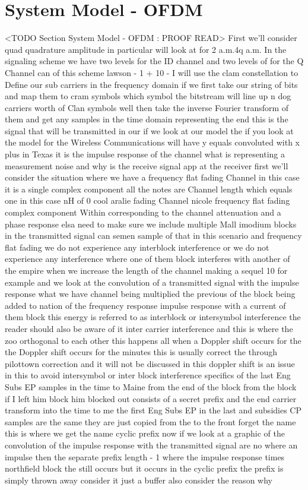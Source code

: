 \section{System Model - OFDM}
	<TODO Section System Model - OFDM : PROOF READ>
First we'll consider quad quadrature amplitude in particular will look at for 2 a.m.4q a.m. In the signaling scheme we have two levels for the ID channel and two levels of for the Q Channel can of this scheme lawson - 1 + 10 - I will use the clam constellation to Define our sub carriers in the frequency domain if we first take our string of bits and map them to cram symbols which symbol the bitstream will line up n dog carriers worth of Clan symbols well then take the inverse Fourier transform of them and get any samples in the time domain representing the end this is the signal that will be transmitted in our if we look at our model the if you look at the model for the Wireless Communications will have y equals convoluted with x plus in Texas it is the impulse response of the channel what is representing a measurement noise and why is the receive signal app at the receiver first we'll consider the situation where we have a frequency flat fading Channel in this case it is a single complex component all the notes are Channel length which equals one in this case nH of 0 cool aralie fading Channel nicole frequency flat fading complex component Within corresponding to the channel attenuation and a phase response elsa need to make sure we include multiple Mall imodium blocks in the transmitted signal can semen sample of that in this scenario and frequency flat fading we do not experience any interblock interference or we do not experience any interference where one of them block interferes with another of the empire when we increase the length of the channel making a sequel 10 for example and we look at the convolution of a transmitted signal with the impulse response what we have channel being multiplied the previous of the block being added to nation of the frequency response impulse response with a current of them block this energy is referred to as interblock or intersymbol interference the reader should also be aware of it inter carrier interference and this is where the zoo orthogonal to each other this happens all when a Doppler shift occurs for the the Doppler shift occurs for the minutes this is usually correct the through pilottown correction and it will not be discussed in this doppler shift is an issue in this to avoid intersymbol or inter block interference specifics of the last Eng Subs EP samples in the time to Maine from the end of the block from the block if I left him block him blocked out consists of a secret prefix and the end carrier transform into the time to me the first Eng Subs EP in the last and subsidies CP samples are the same they are just copied from the to the front forget the name this is where we get the name cyclic prefix now if we look at a graphic of the convolution of the impulse response with the transmitted signal are no where an impulse then the separate prefix length - 1 where the impulse response times northfield block the still occurs but it occurs in the cyclic prefix the prefix is simply thrown away consider it just a buffer also consider the reason why 